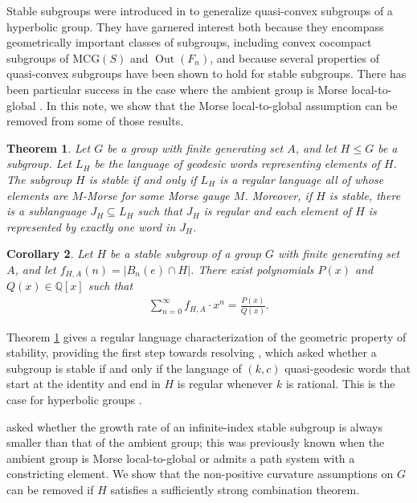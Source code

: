 \documentclass[11pt,letterpaper]{amsart}
\newtheorem{thmx}{Theorem}
\newtheorem{corx}[thmx]{Corollary}
\theoremstyle{definition}
\theoremstyle{plain}
\theoremstyle{TheoremNum}
\DeclareMathOperator{\Out}{\mathrm{Out}}
\begin{document}
Stable subgroups were introduced in \cite{Durham-Taylor-stability} to generalize quasi-convex subgroups of a hyperbolic group. They have garnered interest both because they encompass geometrically important classes of subgroups, including convex cocompact subgroups of $\mathrm{MCG}(S)$ and $\Out(F_n)$, and because several properties of quasi-convex subgroups have been shown to hold for stable subgroups. There has been particular success in the case where the ambient group is Morse local-to-global \cite{CRSZ,Growth-rate-gap-all-Mltg}. In this note, we show that the Morse local-to-global assumption can be removed from some of those results.
\begin{thmx}\label{thm:regular-language}
        Let $G$ be a group with finite generating set $A$, and let $H \leq G$ be a subgroup. Let $L_H$ be the language of geodesic words representing elements of $H$. The subgroup $H$ is stable if and only if $L_H$ is a regular language all of whose elements are $M$-Morse for some Morse gauge $M$. Moreover, if $H$ is stable, there is a sublanguage $J_H \subseteq L_H$ such that $J_H$ is regular and each element of $H$ is represented by exactly one word in $J_H$. 
\end{thmx}
\begin{corx}\label{corx:rational-growth}
    Let $H$ be a stable subgroup of a group $G$ with finite generating set $A$, and let $f_{H,A}(n) = |B_n(e) \cap H|$. There exist polynomials $P(x)$ and $Q(x) \in \mathbb{Q}[x]$ such that 
    \begin{align*}
        \sum_{n=0}^{\infty} f_{H,A} \cdot x^n = \frac{P(x)}{Q(x)}\text{.}
    \end{align*}
\end{corx}
Theorem \ref{thm:regular-language} gives a regular language characterization of the geometric property of stability, providing the first step towards resolving \cite[Question~1]{CRSZ}, which asked whether a subgroup is stable if and only if the language of $(k,c)$ quasi-geodesic words that start at the identity and end in $H$ is regular whenever $k$ is rational. This is the case for hyperbolic groups \cite{Holt-Rees-qgeod-regular,Sam-Patrick-Davide-qgeod-regular}. 

\cite[Question~5]{CRSZ} asked whether the growth rate of an infinite-index stable subgroup is always smaller than that of the ambient group; this was previously known when the ambient group is Morse local-to-global or admits a path system with a constricting element\cite{DFW,CRSZ,Growth-rate-gap-all-Mltg,Abdul-Alex-injective-contracting,Legaspi-path-system-growth}. We show that the non-positive curvature assumptions on $G$ can be removed if $H$ satisfies a sufficiently strong combination theorem.
\end{document}

